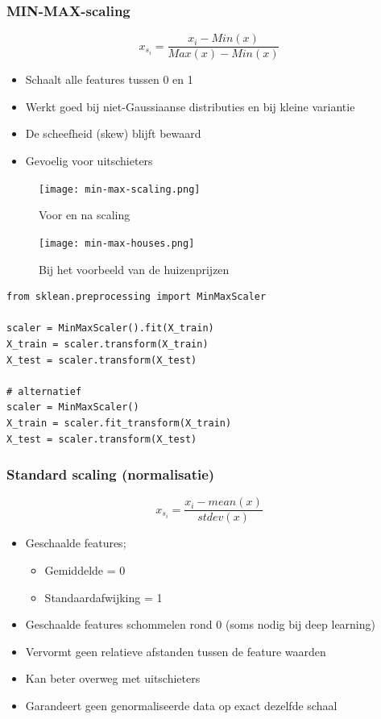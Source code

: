 \documentclass{article}
\begin{document}
\subsubsection{MIN-MAX-scaling}

\begin{equation}
x_{s_i} = \frac{x_i - Min(x)}{Max(x) - Min(x)}
\end{equation}

\begin{itemize}
    \item Schaalt alle features tussen 0 en 1
    \item Werkt goed bij niet-Gaussiaanse distributies en bij kleine variantie
    \item De scheefheid (skew) blijft bewaard
    \item Gevoelig voor uitschieters
\end{itemize}

\begin{figure}[H]
    \centering
    \texttt{[image: min-max-scaling.png]}
    \caption{Voor en na scaling}
\end{figure}

\begin{figure}[H]
    \centering
    \texttt{[image: min-max-houses.png]}
    \caption{Bij het voorbeeld van de huizenprijzen}
\end{figure}

\begin{verbatim}
from sklean.preprocessing import MinMaxScaler

scaler = MinMaxScaler().fit(X_train)
X_train = scaler.transform(X_train)
X_test = scaler.transform(X_test)

# alternatief
scaler = MinMaxScaler()
X_train = scaler.fit_transform(X_train)
X_test = scaler.transform(X_test)
\end{verbatim}

\subsubsection{Standard scaling (normalisatie)}

\begin{equation}
x_{s_i} = \frac{x_i - mean(x)}{stdev(x)}
\end{equation}

\begin{itemize}
    \item Geschaalde features;
    \begin{itemize}
        \item Gemiddelde = 0
        \item Standaardafwijking = 1
    \end{itemize}
    \item Geschaalde features schommelen rond 0 (soms nodig bij deep learning)
    \item Vervormt geen relatieve afstanden tussen de feature waarden
    \item Kan beter overweg met uitschieters
    \item Garandeert geen genormaliseerde data op exact dezelfde schaal
\end{itemize}
\end{document}

